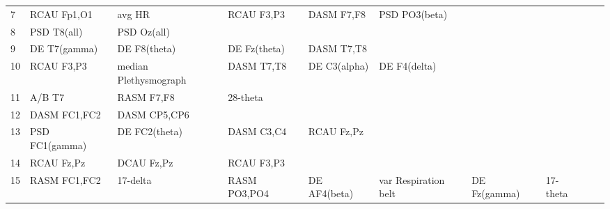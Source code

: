 \begin{landscape}
\begin{table}[]
\begin{tabular}{l|llllllll}
7        & RCAU Fp1,O1           & avg HR                & RCAU F3,P3           & DASM F7,F8              & PSD PO3(beta)           &                      &                      &                       &                       &                    \\
8        & PSD T8(all)           & PSD Oz(all)           &                      &                         &                         &                      &                      &                       &                       &                    \\
9        & DE T7(gamma)          & DE F8(theta)          & DE Fz(theta)         & DASM T7,T8              &                         &                      &                      &                       &                       &                    \\
10       & RCAU F3,P3            & median Plethysmograph & DASM T7,T8           & DE C3(alpha)            & DE F4(delta)            &                      &                      &                       &                       &                    \\
11       & A/B T7                & RASM F7,F8            & 28-theta             &                         &                         &                      &                      &                       &                       &                    \\
12       & DASM FC1,FC2          & DASM CP5,CP6          &                      &                         &                         &                      &                      &                       &                       &                    \\
13       & PSD FC1(gamma)        & DE FC2(theta)         & DASM C3,C4           & RCAU Fz,Pz              &                         &                      &                      &                       &                       &                    \\
14       & RCAU Fz,Pz            & DCAU Fz,Pz            & RCAU F3,P3           &                         &                         &                      &                      &                       &                       &                    \\
15       & RASM FC1,FC2          & 17-delta              & RASM PO3,PO4         & DE AF4(beta)            & var Respiration belt    & DE Fz(gamma)         & 17-theta             &                       &                       &                    \\

\end{tabular}
\end{table}
\end{landscape}
